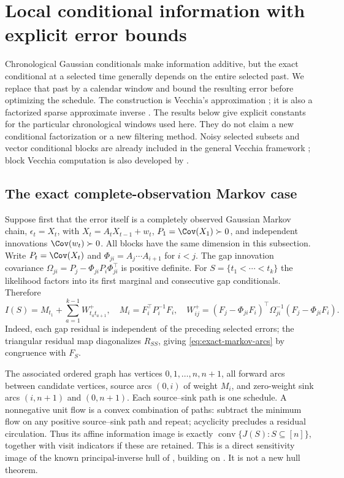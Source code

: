 \section{Local conditional information with explicit error bounds}
\label{sec:locality}
Chronological Gaussian conditionals make information additive, but the exact
conditional at a selected time generally depends on the entire selected past.
We replace that past by a calendar window and bound the resulting error before
optimizing the schedule. The construction is Vecchia's approximation
\citep[Section 3.1]{Vecchia1988}; it is also a factorized sparse approximate
inverse \citep{Schafer2021,Huan2025,KaminetzWebber2026}. The results below
give explicit constants for the particular chronological windows used here.
They do not claim a new conditional factorization or a new filtering method.
Noisy selected subsets and vector conditional blocks are already included in
the general Vecchia framework \citep[Section 2]{KatzfussGuinness2021};
block Vecchia computation is also developed by \citet{Pan2025}.

\subsection{The exact complete-observation Markov case}
\label{subsec:exact-markov}
Suppose first that the error itself is a completely observed Gaussian Markov
chain, $\epsilon_t=X_t$, with
$X_t=A_tX_{t-1}+w_t$, $P_1=\Cov(X_1)\succ0$, and independent innovations
$\Cov(w_t)\succ0$. All blocks have the same dimension in this subsection.
Write $P_t=\Cov(X_t)$ and $\Phi_{ji}=A_j\cdots A_{i+1}$ for $i<j$.
The gap innovation covariance
$\Omega_{ji}=P_j-\Phi_{ji}P_i\Phi_{ji}^{\top}$ is positive definite.
For $S=\{t_1<\cdots<t_k\}$ the likelihood factors into its first marginal
and consecutive gap conditionals. Therefore
\begin{equation}
 I(S)=M_{t_1}+\sum_{a=1}^{k-1} W^+_{t_at_{a+1}},\quad
 M_i=F_i^\top P_i^{-1}F_i,\quad
 W^+_{ij}=(F_j-\Phi_{ji}F_i)^\top\Omega_{ji}^{-1}
                       (F_j-\Phi_{ji}F_i).
 \label{eq:exact-markov-arcs}
\end{equation}
Indeed, each gap residual is independent of the preceding selected errors;
the triangular residual map diagonalizes $R_{SS}$, giving
\eqref{eq:exact-markov-arcs} by congruence with $F_S$.

The associated ordered graph has vertices $0,1,\ldots,n,n+1$, all forward
arcs between candidate vertices, source arcs $(0,i)$ of weight $M_i$, and
zero-weight sink arcs $(i,n+1)$ and $(0,n+1)$. Each source--sink path is one
schedule. A nonnegative unit flow is a convex combination of paths: subtract
the minimum flow on any positive source--sink path and repeat; acyclicity
precludes a residual circulation. Thus its affine information image is exactly
$\operatorname{conv}\{J(S):S\subseteq[n]\}$, together with visit indicators
if these are retained. This is a direct sensitivity image of the known
principal-inverse hull of \citet{Lee2026}, building on \citet{Wei2023}.
It is not a new hull theorem.

